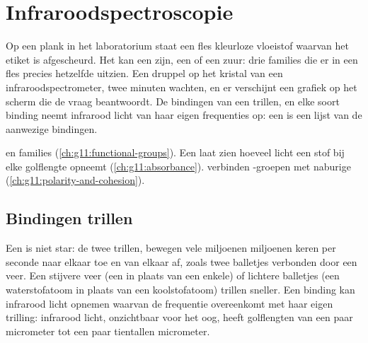 \chapter{Infraroodspectroscopie}\label{ch:g11:infrared}

Op een plank in het laboratorium staat een fles kleurloze vloeistof
waarvan het etiket is afgescheurd. Het kan een  zijn, een 
of een zuur: drie families die er in een fles precies hetzelfde uitzien.
Een druppel op het kristal van een infraroodspectrometer, twee minuten
wachten, en er verschijnt een grafiek op het scherm die de vraag
beantwoordt. De bindingen van een  trillen, en elke soort binding
neemt infrarood licht van haar eigen frequenties op: een
 is een lijst van de aanwezige bindingen.

\begin{recall}
 en families (\cref{ch:g11:functional-groups}).
Een  laat zien hoeveel licht een stof bij elke
golflengte opneemt (\cref{ch:g11:absorbance}).  verbinden
-groepen met naburige 
(\cref{ch:g11:polarity-and-cohesion}).
\end{recall}

\section{Bindingen trillen}

Een  is niet star: de twee  trillen, bewegen
vele miljoenen miljoenen keren per seconde naar elkaar toe en van elkaar
af, zoals twee balletjes verbonden door een veer. Een stijvere veer (een
 in plaats van een enkele) of lichtere balletjes (een
waterstofatoom in plaats van een koolstofatoom) trillen sneller. Een
binding kan infrarood licht opnemen waarvan de frequentie overeenkomt
met haar eigen trilling: infrarood licht, onzichtbaar voor het oog, heeft
golflengten van een paar micrometer tot een paar tientallen micrometer.

